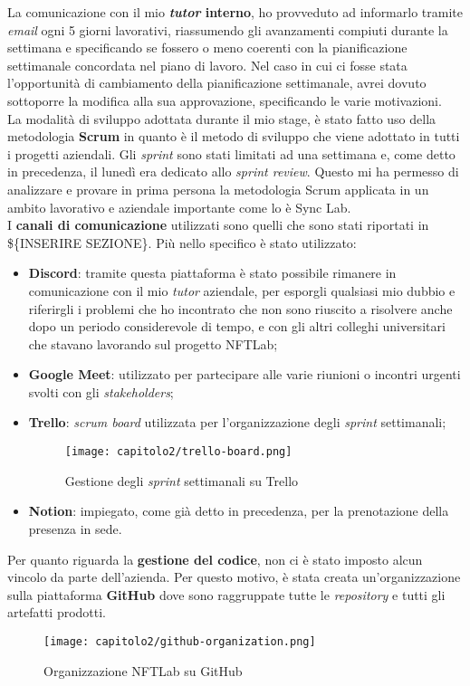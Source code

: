 La comunicazione con il mio \textbf{\emph{tutor} interno}, ho provveduto ad informarlo tramite \emph{email} ogni 5 giorni lavorativi, riassumendo gli avanzamenti compiuti durante la settimana e specificando se fossero o meno coerenti con la pianificazione settimanale concordata nel piano di lavoro. Nel caso in cui ci fosse stata l'opportunità di cambiamento della pianificazione settimanale, avrei dovuto sottoporre la modifica alla sua approvazione, specificando le varie motivazioni. \\

La modalità di sviluppo adottata durante il mio stage, è stato fatto uso della metodologia \textbf{Scrum} in quanto è il metodo di sviluppo che viene adottato in tutti i progetti aziendali. Gli \emph{sprint} sono stati limitati ad una settimana e, come detto in precedenza, il lunedì era dedicato allo \emph{sprint review}. Questo mi ha permesso di analizzare e provare in prima persona la metodologia Scrum applicata in un ambito lavorativo e aziendale importante come lo è Sync Lab. \\

I \textbf{canali di comunicazione} utilizzati sono quelli che sono stati riportati in \$\{INSERIRE SEZIONE\}. Più nello specifico è stato utilizzato:
\begin{itemize}
  \item \textbf{Discord}: tramite questa piattaforma è stato possibile rimanere in comunicazione con il mio \emph{tutor} aziendale, per esporgli qualsiasi mio dubbio e riferirgli i problemi che ho incontrato che non sono riuscito a risolvere anche dopo un periodo considerevole di tempo, e con gli altri colleghi universitari che stavano lavorando sul progetto NFTLab;
  \item \textbf{Google Meet}: utilizzato per partecipare alle varie riunioni o incontri urgenti svolti con gli \emph{stakeholders};
  \item \textbf{Trello}: \emph{scrum board} utilizzata per l'organizzazione degli \emph{sprint} settimanali;
  
  \clearpage
  \begin{figure}[!h]
    \centering
    \texttt{[image: capitolo2/trello-board.png]}
    \caption{Gestione degli \emph{sprint} settimanali su Trello}
  \end{figure}

  \item \textbf{Notion}: impiegato, come già detto in precedenza, per la prenotazione della presenza in sede.
\end{itemize}

Per quanto riguarda la \textbf{gestione del codice}, non ci è stato imposto alcun vincolo da parte dell'azienda. Per questo motivo, è stata creata un'organizzazione sulla piattaforma \textbf{GitHub} dove sono raggruppate tutte le \emph{repository} e tutti gli artefatti prodotti.

\begin{figure}[!h]
  \centering
  \texttt{[image: capitolo2/github-organization.png]}
  \caption{Organizzazione NFTLab su GitHub}
\end{figure}
